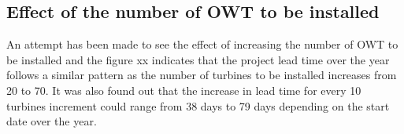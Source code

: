 \subsection{Effect of the number of OWT to be installed}

An attempt has been made to see the effect of increasing the number of OWT to be installed and the figure xx indicates that the project lead time over the year follows a similar pattern as the number of turbines to be installed increases from 20 to 70. It was also found out that the increase in lead time for every 10 turbines increment could range from 38 days to 79 days depending on the start date over the year.  

 